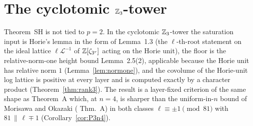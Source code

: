 \documentclass[11pt]{amsart}
\theoremstyle{remark}\newtheorem{remark}[theorem]{Remark}
\theoremstyle{definition}\newtheorem{definition}[theorem]{Definition}
\begin{document}
\section{The cyclotomic $\mathbb{Z}_3$-tower}\label{sec:p3}
Theorem~SH is not tied to $p=2$. In the cyclotomic $\mathbb{Z}_3$-tower the saturation input is Horie's lemma in the form of \cite{MO13} Lemma~1.3 (the $\ell$-th-root statement on the ideal lattice $\ell\mathcal L^{-1}$ of $\mathbb{Z}[\zeta_{3^r}]$ acting on the Horie unit), the floor is the relative-norm-one height bound \cite{MO16} Lemma~2.5(2), applicable because the Horie unit has relative norm $1$ (Lemma~\ref{lem:normone}), and the covolume of the Horie-unit log lattice is positive at every layer and is computed exactly by a character product (Theorem~\ref{thm:rank3}). The result is a layer-fixed criterion of the same shape as Theorem~A which, at $n=4$, is sharper than the uniform-in-$n$ bound of Morisawa and Okazaki (\cite{MO16} Thm.~A) in both classes $\ell\equiv\pm1\pmod{81}$ with $81\,\|\,\ell\mp1$ (Corollary~\ref{cor:P3n4}).
\end{document}
